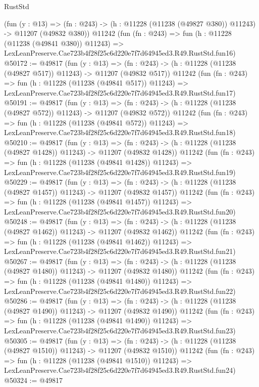 \begin{lexlean}{RustStd}
\begin{coremodule}
    (fun (y : @13) =>
    (fn : @243) -> (h : @11228 (@11238 (@49827 @380)) @11243) -> @11207 (@49832 @380))
    @11242
    (fun (fn : @243) =>
    fun (h : @11228 (@11238 (@49841 @380)) @11243) =>
    LexLeanPreserve.Cae723b4f28f25c6d220e7f7d64945ed3.R49.RustStd.fun16)
@50172 := @49817
    (fun (y : @13) =>
    (fn : @243) -> (h : @11228 (@11238 (@49827 @517)) @11243) -> @11207 (@49832 @517))
    @11242
    (fun (fn : @243) =>
    fun (h : @11228 (@11238 (@49841 @517)) @11243) =>
    LexLeanPreserve.Cae723b4f28f25c6d220e7f7d64945ed3.R49.RustStd.fun17)
@50191 := @49817
    (fun (y : @13) =>
    (fn : @243) -> (h : @11228 (@11238 (@49827 @572)) @11243) -> @11207 (@49832 @572))
    @11242
    (fun (fn : @243) =>
    fun (h : @11228 (@11238 (@49841 @572)) @11243) =>
    LexLeanPreserve.Cae723b4f28f25c6d220e7f7d64945ed3.R49.RustStd.fun18)
@50210 := @49817
    (fun (y : @13) =>
    (fn : @243) -> (h : @11228 (@11238 (@49827 @1428)) @11243) -> @11207 (@49832 @1428))
    @11242
    (fun (fn : @243) =>
    fun (h : @11228 (@11238 (@49841 @1428)) @11243) =>
    LexLeanPreserve.Cae723b4f28f25c6d220e7f7d64945ed3.R49.RustStd.fun19)
@50229 := @49817
    (fun (y : @13) =>
    (fn : @243) -> (h : @11228 (@11238 (@49827 @1457)) @11243) -> @11207 (@49832 @1457))
    @11242
    (fun (fn : @243) =>
    fun (h : @11228 (@11238 (@49841 @1457)) @11243) =>
    LexLeanPreserve.Cae723b4f28f25c6d220e7f7d64945ed3.R49.RustStd.fun20)
@50248 := @49817
    (fun (y : @13) =>
    (fn : @243) -> (h : @11228 (@11238 (@49827 @1462)) @11243) -> @11207 (@49832 @1462))
    @11242
    (fun (fn : @243) =>
    fun (h : @11228 (@11238 (@49841 @1462)) @11243) =>
    LexLeanPreserve.Cae723b4f28f25c6d220e7f7d64945ed3.R49.RustStd.fun21)
@50267 := @49817
    (fun (y : @13) =>
    (fn : @243) -> (h : @11228 (@11238 (@49827 @1480)) @11243) -> @11207 (@49832 @1480))
    @11242
    (fun (fn : @243) =>
    fun (h : @11228 (@11238 (@49841 @1480)) @11243) =>
    LexLeanPreserve.Cae723b4f28f25c6d220e7f7d64945ed3.R49.RustStd.fun22)
@50286 := @49817
    (fun (y : @13) =>
    (fn : @243) -> (h : @11228 (@11238 (@49827 @1490)) @11243) -> @11207 (@49832 @1490))
    @11242
    (fun (fn : @243) =>
    fun (h : @11228 (@11238 (@49841 @1490)) @11243) =>
    LexLeanPreserve.Cae723b4f28f25c6d220e7f7d64945ed3.R49.RustStd.fun23)
@50305 := @49817
    (fun (y : @13) =>
    (fn : @243) -> (h : @11228 (@11238 (@49827 @1510)) @11243) -> @11207 (@49832 @1510))
    @11242
    (fun (fn : @243) =>
    fun (h : @11228 (@11238 (@49841 @1510)) @11243) =>
    LexLeanPreserve.Cae723b4f28f25c6d220e7f7d64945ed3.R49.RustStd.fun24)
@50324 := @49817

\end{coremodule}
\end{lexlean}
